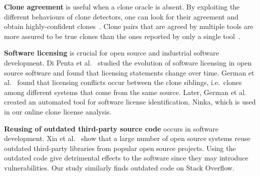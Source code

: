 \documentclass[10pt,journal,compsoc]{IEEEtran}
\begin{document}
\textbf{Clone agreement} is useful when a clone oracle is
absent. %
By exploiting the different behaviours of clone detectors,
one can look for their agreement and obtain
highly-confident clones~\cite{Bellon2007,Wang2013}. %
Clone pairs that are agreed by multiple tools are more assured to be true
clones than the ones reported by only a single
tool~\cite{Wang2013,cr2016ssbse,Funaro2010}. 

\textbf{Software licensing} is crucial for open source and 
industrial software development. Di Penta et al.~\cite{DiPenta2010}
studied the evolution of software licensing in open source 
software and found that licensing statements change over 
time. German et al.~\cite{German2009} found that licensing 
conflicts occur between the clone siblings, i.e.~clones among 
different systems that come from the same source. Later, 
German et al.~\cite{German2010} created an automated tool 
for software license identification, Ninka, which is used
in our online clone license analysis. 

\textbf{Reusing of outdated third-party source code} occurs 
in software development. Xia et al.~\cite{Xia2014} show that 
a large number of open source systems reuse outdated third-party 
libraries from popular open source projects. Using the outdated 
code give detrimental effects to the software since they may 
introduce vulnerabilities. Our study similarly finds
outdated code on Stack Overflow.
\end{document}
